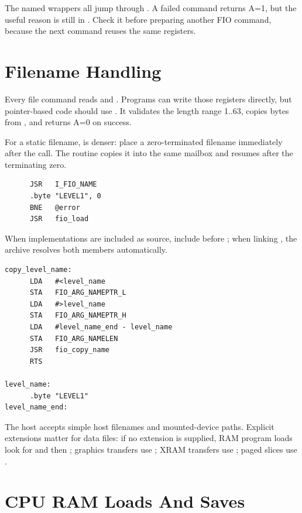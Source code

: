 The named wrappers all jump through . A failed command
returns A=1, but the useful reason is still in . Check it
before preparing another FIO command, because the next command reuses the same
registers.

\section{Filename Handling}

Every file command reads  and .
Programs can write those registers directly, but pointer-based code should use
. It validates the length range 1..63, copies bytes
from , and returns A=0 on success.

For a static filename,  is denser: place a
zero-terminated filename immediately after the call. The routine copies it into
the same mailbox and resumes after the terminating zero.

\begin{lstlisting}
      JSR   I_FIO_NAME
      .byte "LEVEL1", 0
      BNE   @error
      JSR   fio_load
\end{lstlisting}

When implementations are included as source, include
 before ; when linking
, the archive resolves both members automatically.

\begin{lstlisting}
copy_level_name:
      LDA   #<level_name
      STA   FIO_ARG_NAMEPTR_L
      LDA   #>level_name
      STA   FIO_ARG_NAMEPTR_H
      LDA   #level_name_end - level_name
      STA   FIO_ARG_NAMELEN
      JSR   fio_copy_name
      RTS

level_name:
      .byte "LEVEL1"
level_name_end:
\end{lstlisting}

The host accepts simple host filenames and mounted-device paths. Explicit
extensions matter for data files: if no extension is supplied, RAM program
loads look for  and then ; graphics transfers use
; XRAM transfers use ; paged slices use
.

\section{CPU RAM Loads And Saves}


